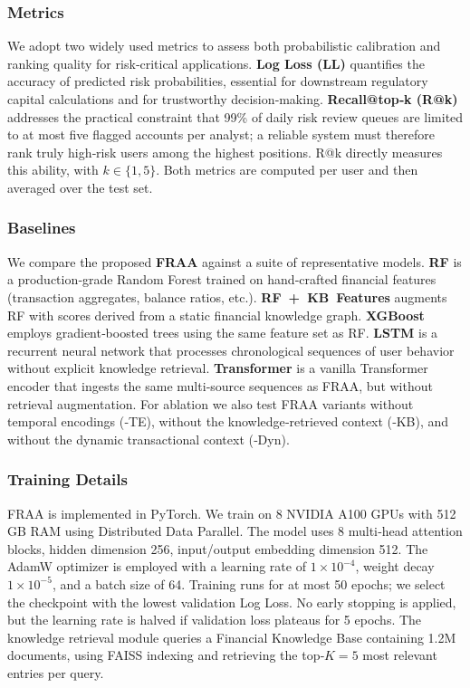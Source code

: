 \documentclass[10pt,twocolumn]{article}
\begin{document}
\subsubsection{Metrics}
We adopt two widely used metrics to assess both probabilistic calibration and ranking quality for risk‑critical applications. \textbf{Log Loss (LL)} quantifies the accuracy of predicted risk probabilities, essential for downstream regulatory capital calculations and for trustworthy decision‑making. \textbf{Recall@top‑k (R@k)} addresses the practical constraint that 99\% of daily risk review queues are limited to at most five flagged accounts per analyst; a reliable system must therefore rank truly high‑risk users among the highest positions. R@k directly measures this ability, with $k\in\{1,5\}$. Both metrics are computed per user and then averaged over the test set.

\subsubsection{Baselines}
We compare the proposed \textbf{FRAA} against a suite of representative models. \textbf{RF} is a production‑grade Random Forest trained on hand‑crafted financial features (transaction aggregates, balance ratios, etc.). \textbf{RF~+~KB~Features} augments RF with scores derived from a static financial knowledge graph. \textbf{XGBoost} employs gradient‑boosted trees using the same feature set as RF. \textbf{LSTM} is a recurrent neural network that processes chronological sequences of user behavior without explicit knowledge retrieval. \textbf{Transformer} is a vanilla Transformer encoder that ingests the same multi‑source sequences as FRAA, but without retrieval augmentation. For ablation we also test FRAA variants without temporal encodings (‑TE), without the knowledge‑retrieved context (‑KB), and without the dynamic transactional context (‑Dyn).

\subsubsection{Training Details}
FRAA is implemented in PyTorch. We train on 8 NVIDIA A100 GPUs with 512 GB RAM using Distributed Data Parallel. The model uses 8 multi‑head attention blocks, hidden dimension 256, input/output embedding dimension 512. The AdamW optimizer is employed with a learning rate of \(1\times10^{-4}\), weight decay \(1\times10^{-5}\), and a batch size of 64. Training runs for at most 50 epochs; we select the checkpoint with the lowest validation Log Loss. No early stopping is applied, but the learning rate is halved if validation loss plateaus for 5 epochs. The knowledge retrieval module queries a Financial Knowledge Base containing 1.2M documents, using FAISS indexing and retrieving the top‑\(K=5\) most relevant entries per query.
\end{document}
